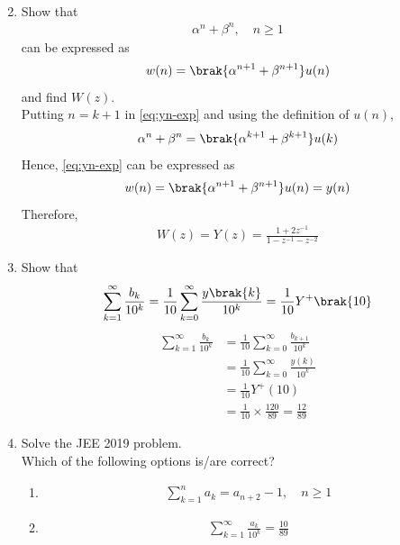 \documentclass[journal,12pt,twocolumn]{IEEEtran}
\renewcommand\thesection{\arabic{section}}
\begin{document}
\begin{enumerate}[label=\thesection.\arabic*,ref=\thesection.\theenumi]
\begin{align}
\end{align}
\item Show that 
\begin{align}
	\alpha^n + \beta^n, \quad n \ge 1
    \label{eq:yn-exp}
\end{align}
can be expressed as 
\begin{align}
	w(n) = \brak{\alpha^{n+1} + \beta^{n+1}}u(n)
\end{align}
and find $W(z)$.\\
\solution Putting $n = k + 1$ in \eqref{eq:yn-exp} and using the definition of $u(n)$, 
\begin{align}
\alpha^n + \beta^n = \brak{\alpha^{k + 1} + \beta^{k + 1}}u(k)
\end{align}
Hence, \eqref{eq:yn-exp} can be expressed as
\begin{align}
w(n) = \brak{\alpha^{n+1} + \beta^{n+1}}u(n) = y(n)
\end{align}
Therefore,
\begin{align}
    W(z) = Y(z) = \frac{1 + 2z^{-1}}{1 - z^{-1} - z^{-2}}
\end{align}
 \item Show that 
\begin{align}
	\sum_{k=1}^{\infty}\frac{b_k}{10^k} =
	\frac{1}{10}\sum_{k=0}^{\infty}\frac{y\brak{k}}{10^k} =\frac{1}{10}Y^{+}\brak{{10}}
\end{align}
\label{pr:1-4}
\solution
\begin{align}
    \sum_{k=1}^{\infty}\frac{b_k}{10^k} &= \frac{1}{10}\sum_{k = 0}^{\infty}\frac{b_{k+1}}{10^k} \\
                                        &= \frac{1}{10}\sum_{k = 0}^{\infty}\frac{y(k)}{10^k} \\
                                        &= \frac{1}{10}Y^+(10) \\
                                        &= \frac{1}{10}\times\frac{120}{89} = \frac{12}{89}
\end{align}
\item Solve the JEE 2019 problem.\\
Which of the following options is/are correct?
\begin{enumerate}
 \item 
\begin{align}
	\sum_{k=1}^{n}a_k = a_{n+2}-1, \quad n \ge 1
\end{align}
 \item 
\begin{align}
	\sum_{k=1}^{\infty}\frac{a_k}{10^k} =\frac{10}{89}

\end{align}
\end{enumerate}
\end{enumerate}
\end{document}

